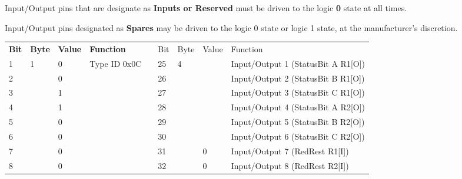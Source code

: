 \documentclass[]{article}
\begin{document}
Input/Output pins that are designate as \textbf{Inputs or Reserved} must be driven to the logic \textbf{0} state at all times.

Input/Output pins designated as \textbf{Spares} may be driven to the logic 0 state or logic 1 state, at the manufacturer's discretion.

\begin{landscape}
	\begin{table}[]
		\centering
		\begin{tabular}{lllllllll}
			\cline{1-4} \cline{6-9}
			\textbf{Bit} & \textbf{Byte}      & \textbf{Value}    & \textbf{Function}             & \multirow{9}{*}{} & Bit & Byte               & Value             & Function                               \\ \cline{1-4} \cline{6-9} 
			1            & \multirow{8}{*}{1} & 0                 & \multirow{8}{*}{Type ID 0x0C} &                   & 25  & \multirow{8}{*}{4} & \multirow{6}{*}{} & Input/Output 1 (StatusBit A R1{[}O{]}) \\
			2            &                    & 0                 &                               &                   & 26  &                    &                   & Input/Output 2 (StatusBit B R1{[}O{]}) \\
			3            &                    & 1                 &                               &                   & 27  &                    &                   & Input/Output 3 (StatusBit C R1{[}O{]}) \\
			4            &                    & 1                 &                               &                   & 28  &                    &                   & Input/Output 4 (StatusBit A R2{[}O{]}) \\
			5            &                    & 0                 &                               &                   & 29  &                    &                   & Input/Output 5 (StatusBit B R2{[}O{]}) \\
			6            &                    & 0                 &                               &                   & 30  &                    &                   & Input/Output 6 (StatusBit C R2{[}O{]}) \\ \cline{8-9} 
			7            &                    & 0                 &                               &                   & 31  &                    & 0                 & Input/Output 7 (RedRest R1{[}I{]})     \\
			8            &                    & 0                 &                               &                   & 32  &                    & 0                 & Input/Output 8 (RedRest R2{[}I{]})     \\ \cline{1-4} \cline{6-9} 

\end{tabular}
\end{table}
\end{landscape}
\end{document}
